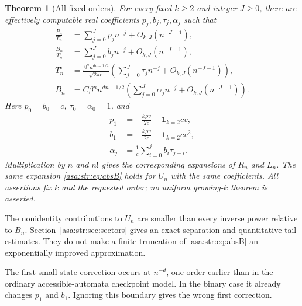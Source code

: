 \documentclass[11pt,letterpaper]{article}
\newtheorem{theorem}{Theorem}[section]
\theoremstyle{remark}\newtheorem{remark}[theorem]{Remark}
\numberwithin{equation}{section}
\newcommand{\ind}{\mathbf 1}\newcommand{\fall}[2]{(#1)_{\underline{#2}}}
\begin{document}
\begin{theorem}[All fixed orders]\label{asa:str:thm:main}
For every fixed $k\ge2$ and integer $J\ge0$, there are effectively computable real coefficients $p_j,b_j,\tau_j,\alpha_j$ such that
\begin{align}
 \frac{P_n}{T^{\circ}_n}&=\sum_{j=0}^Jp_jn^{-j}+O_{k,J}(n^{-J-1}),\label{asa:str:eq:Pexp}\\
 \frac{B_n}{T^{\circ}_n}&=\sum_{j=0}^Jb_jn^{-j}+O_{k,J}(n^{-J-1}),\label{asa:str:eq:Bexp}\\
 T^{\circ}_n&=\frac{\beta^nn^{dn-1/2}}{\sqrt{2\pi c}}
 \left(\sum_{j=0}^J\tau_jn^{-j}+O_{k,J}(n^{-J-1})\right),\label{asa:str:eq:Texp}\\
 B_n&=C\beta^nn^{dn-1/2}
 \left(\sum_{j=0}^J\alpha_jn^{-j}+O_{k,J}(n^{-J-1})\right).\label{asa:str:eq:absB}
\end{align}
Here $p_0=b_0=c$, $\tau_0=\alpha_0=1$, and
\begin{align}
 p_1&=-\frac{k\rho v}{2c}-\ind_{k=2}cv,\label{asa:str:eq:p1}\\
 b_1&=-\frac{k\rho v}{2c}-\ind_{k=2}cv^2,\label{asa:str:eq:b1}\\
 \alpha_j&=\frac1c\sum_{i=0}^jb_i\tau_{j-i}.\label{asa:str:eq:alpha}
\end{align}
Multiplication by $n$ and $n!$ gives the corresponding expansions of $R_n$ and $L_n$. The same expansion \eqref{asa:str:eq:absB} holds for $U_n$ with the same coefficients. All assertions fix $k$ and the requested order; no uniform growing-$k$ theorem is asserted.
\end{theorem}
The nonidentity contributions to $U_n$ are smaller than every inverse power relative to $B_n$. Section~\ref{asa:str:sec:sectors} gives an exact separation and quantitative tail estimates. They do not make a finite truncation of \eqref{asa:str:eq:absB} an exponentially improved approximation.

The first small-state correction occurs at $n^{-d}$, one order earlier than in the ordinary accessible-automata checkpoint model. In the binary case it already changes $p_1$ and $b_1$. Ignoring this boundary gives the wrong first correction.
\end{document}
